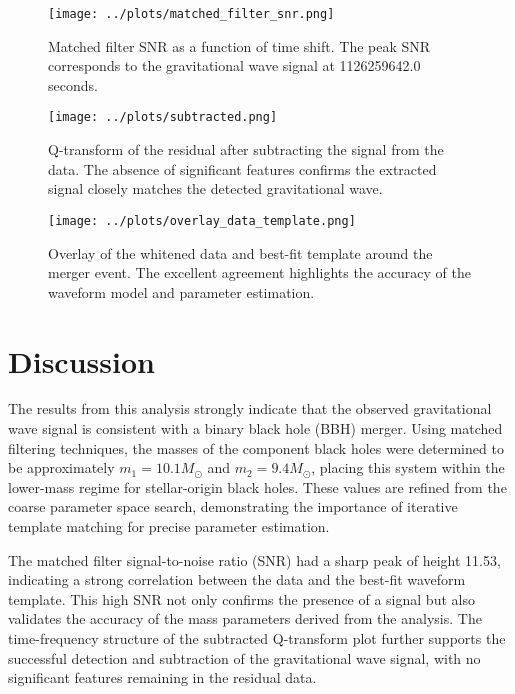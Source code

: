\documentclass{article}
\begin{document}
\begin{figure}[H]
    \centering
    \texttt{[image: ../plots/matched\_filter\_snr.png]}
    \caption{Matched filter SNR as a function of time shift. The peak SNR corresponds to the gravitational wave signal at 1126259642.0 seconds.}
    \label{fig:matched_filter_snr}
\end{figure}

\begin{figure}[H]
    \centering
    \texttt{[image: ../plots/subtracted.png]}
    \caption{Q-transform of the residual after subtracting the signal from the data. The absence of significant features confirms the extracted signal closely matches the detected gravitational wave.}
    \label{fig:subtracted}
\end{figure}

\begin{figure}[H]
    \centering
    \texttt{[image: ../plots/overlay\_data\_template.png]}
    \caption{Overlay of the whitened data and best-fit template around the merger event. The excellent agreement highlights the accuracy of the waveform model and parameter estimation.}
    \label{fig:overlay_data_template}
\end{figure}

\section{Discussion}

The results from this analysis strongly indicate that the observed gravitational wave signal is consistent with a binary black hole (BBH) merger. Using matched filtering techniques, the masses of the component black holes were determined to be approximately \( m_1 = 10.1 M_\odot \) and \( m_2 = 9.4 M_\odot \), placing this system within the lower-mass regime for stellar-origin black holes. These values are refined from the coarse parameter space search, demonstrating the importance of iterative template matching for precise parameter estimation.

The matched filter signal-to-noise ratio (SNR) had a sharp peak of height 11.53, indicating a strong correlation between the data and the best-fit waveform template. This high SNR not only confirms the presence of a signal but also validates the accuracy of the mass parameters derived from the analysis. The time-frequency structure of the subtracted Q-transform plot further supports the successful detection and subtraction of the gravitational wave signal, with no significant features remaining in the residual data.
\end{document}
